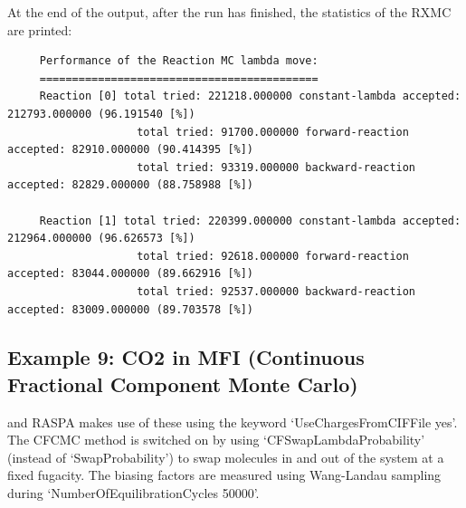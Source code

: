 At the end of the output, after the run has finished, the statistics of the RXMC are printed:
\begin{tiny}
\begin{verbatim}
     Performance of the Reaction MC lambda move:
     ===========================================
     Reaction [0] total tried: 221218.000000 constant-lambda accepted: 212793.000000 (96.191540 [%])
                    total tried: 91700.000000 forward-reaction accepted: 82910.000000 (90.414395 [%])
                    total tried: 93319.000000 backward-reaction accepted: 82829.000000 (88.758988 [%])
     
     Reaction [1] total tried: 220399.000000 constant-lambda accepted: 212964.000000 (96.626573 [%])
                    total tried: 92618.000000 forward-reaction accepted: 83044.000000 (89.662916 [%])
                    total tried: 92537.000000 backward-reaction accepted: 83009.000000 (89.703578 [%])
\end{verbatim}
\end{tiny}

\subsection*{Example 9: CO2 in MFI (Continuous Fractional Component Monte Carlo)}

and RASPA makes use of these using the keyword `UseChargesFromCIFFile yes'.
The CFCMC method is switched on by using `CFSwapLambdaProbability' (instead of `SwapProbability') to swap molecules in and out of the system at a fixed fugacity.
The biasing factors are measured using Wang-Landau sampling during `NumberOfEquilibrationCycles 50000'.

